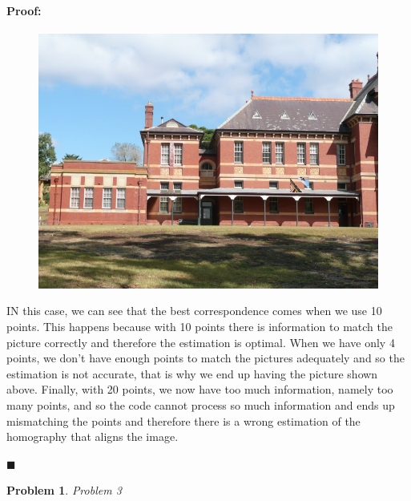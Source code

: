 \documentclass[12pt]{article}
\newenvironment{proof}{\paragraph{Proof: }}{\hfill$\blacksquare$}
\newtheorem{problem}{Problem}%
\begin{document}
\begin{proof}
\begin{enumerate}
\begin{figure}[H]
\begin{center}
\advance\leftskip-3cm
\advance\rightskip-3cm
\includegraphics[keepaspectratio=true, scale = 0.5]{red_stitched1_20.png}
\caption{}
\label{Red stichted with 20 points}
\end{center}
\end{figure}

IN this case, we can see that the best correspondence comes when we use 10 points. This happens because with 10 points there is information to match the picture correctly and therefore the estimation is optimal. When we have only 4 points, we don't have enough points to match the pictures adequately and so the estimation is not accurate, that is why we end up having the picture shown above. Finally, with 20 points, we now have too much information, namely too many points, and so the code cannot process so much information and ends up mismatching the points and therefore there is a wrong estimation of the homography that aligns the image. 

\end{enumerate}
\end{proof}

\pagebreak
\begin{problem}

Problem 3

\end{problem}
\end{document}
